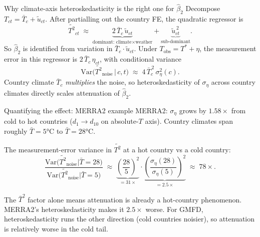 \documentclass[10pt,aspectratio=169]{beamer}
\begin{document}
\begin{frame}{Why climate-axis heteroskedasticity is the right one for $\hat\beta_2$}
  Decompose $T_{ct} = \bar T_c + \tilde u_{ct}$. After partialling out the
  country FE, the quadratic regressor is
  \[
    \widetilde{T^2}_{ct} \;\approx\;
      \underbrace{2\,\bar T_c\,\tilde u_{ct}}_{\text{dominant: climate}\times\text{weather}}
      + \underbrace{\tilde u_{ct}^{\,2}}_{\text{sub-dominant}}.
  \]
  So $\hat\beta_2$ is identified from variation in
  $\bar T_c \cdot \tilde u_{ct}$. Under $T_{\text{obs}} = T^* + \eta$, the
  measurement error in this regressor is $2\,\bar T_c\,\eta_{ct}$, with
  conditional variance
  \[
    \mathrm{Var}\bigl(\widetilde{T^2}_{\text{noise}} \,\big|\, c, t\bigr)
    \;\approx\; 4\,\bar T_c^{\,2}\,\sigma_\eta^2(c).
  \]
  Country climate $\bar T_c$ \emph{multiplies} the noise, so
  heteroskedasticity of $\sigma_\eta$ across country climates directly
  scales attenuation of $\hat\beta_2$.
\end{frame}

\begin{frame}{Quantifying the effect: MERRA2 example}
  MERRA2: $\sigma_\eta$ grows by $1.58\times$ from cold to hot countries
  ($d_1 \to d_{10}$ on absolute-$T$ axis). Country climates span roughly
  $\bar T = 5$°C to $\bar T = 28$°C.

  \vspace{0.4em}
  The measurement-error variance in $\widetilde{T^2}$ at a hot country vs a
  cold country:
  \[
    \frac{\mathrm{Var}\bigl(\widetilde{T^2}_{\text{noise}} | \bar T = 28\bigr)}
         {\mathrm{Var}\bigl(\widetilde{T^2}_{\text{noise}} | \bar T = 5\bigr)}
    \;\approx\;
    \underbrace{\left(\frac{28}{5}\right)^2}_{=31\times} \cdot
    \underbrace{\left(\frac{\sigma_\eta(28)}{\sigma_\eta(5)}\right)^2}_{=2.5\times}
    \;\approx\; 78\times.
  \]

  \vspace{0.4em}
  \footnotesize
  The $\bar T^2$ factor alone means attenuation is already a hot-country
  phenomenon. MERRA2's heteroskedasticity makes it $2.5\times$ worse. For
  GMFD, heteroskedasticity runs the other direction (cold countries
  noisier), so attenuation is relatively worse in the cold tail.
\end{frame}
\end{document}
